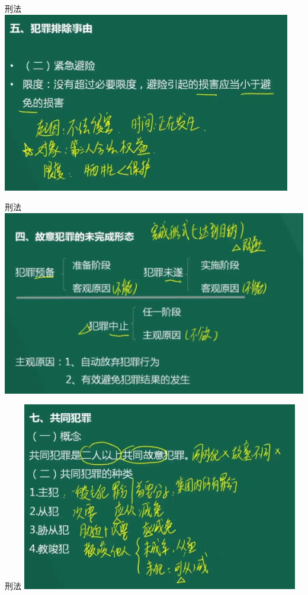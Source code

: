 \documentclass[aspectratio=169]{beamer}
\begin{document}
\begin{frame}[t]{刑法}
    \includegraphics[scale=0.6]{emergyce-avoiding}\\ 
\end{frame}


\begin{frame}[t]{刑法}
    \includegraphics[scale=0.6]{criminal_status}\\ 
\end{frame}


\begin{frame}[t]{刑法}
    \includegraphics[scale=0.6]{criminal_together}\\ 
\end{frame}
\end{document}
